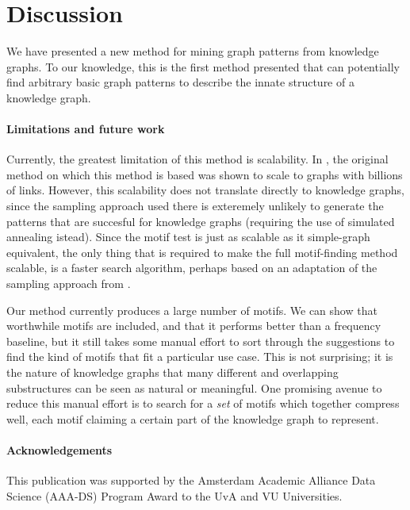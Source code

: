 \documentclass[runningheads]{style/llncs}
\begin{document}
\section{Discussion}

We have presented a new method for mining graph patterns from knowledge graphs. To our knowledge, this is the first method presented that can potentially find arbitrary basic graph patterns to describe the innate structure of a knowledge graph.

\paragraph{Limitations and future work}

Currently, the greatest limitation of this method is scalability. In \cite{bloem2017large}, the original method on which this method is based was shown to scale to graphs with billions of links. However, this scalability does not translate directly to knowledge graphs, since the sampling approach used there is exteremely unlikely to generate the patterns that are succesful for knowledge graphs (requiring the use of simulated annealing istead). Since the motif test is just as scalable as it simple-graph equivalent, the only thing that is required to make the full motif-finding method scalable, is a faster search algorithm, perhaps based on an adaptation of the sampling approach from \cite{bloem2017large}.

Our method currently produces a large number of motifs. We can show that worthwhile motifs are included, and that it performs better than a frequency baseline, but it still takes some manual effort to sort through the suggestions to find the kind of motifs that fit a particular use case. This is not surprising; it is the nature of knowledge graphs that many different and overlapping substructures can be seen as natural or meaningful. One promising avenue to reduce this manual effort is to search for a \emph{set} of motifs which together compress well, each motif claiming a certain part of the knowledge graph to represent. 

\paragraph{Acknowledgements}

This publication was supported by the Amsterdam Academic Alliance Data Science (AAA-DS) Program Award to the UvA and VU Universities. 



\end{document}
